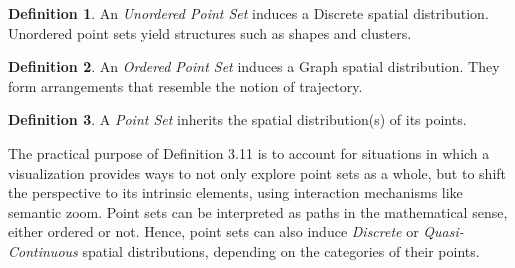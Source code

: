\documentclass[]{interact}
\theoremstyle{plain}%
\theoremstyle{definition}
\theoremstyle{remark}
\theoremstyle{definition}
\newtheorem{defn}{Definition}[section]
\begin{document}

\begin{defn}
	An \emph{Unordered Point Set} induces a Discrete spatial distribution. Unordered point sets yield structures such as shapes and clusters.
\end{defn}

\begin{defn}
	An \emph{Ordered Point Set} induces a Graph spatial distribution. They form arrangements that resemble the notion of trajectory.
\end{defn}

\begin{defn}
	A \emph{Point Set} inherits the spatial distribution(s) of its points.
\end{defn}


The practical purpose of Definition 3.11 is to account for situations in which a visualization provides ways to not only explore point sets as a whole, but to shift the perspective to its intrinsic elements, using interaction mechanisms like semantic zoom. Point sets can be interpreted as paths in the mathematical sense, either ordered or not. Hence, point sets can also induce \emph{Discrete} or \emph{Quasi-Continuous} spatial distributions, depending on the categories of their points.





%
%
%
\end{document}
